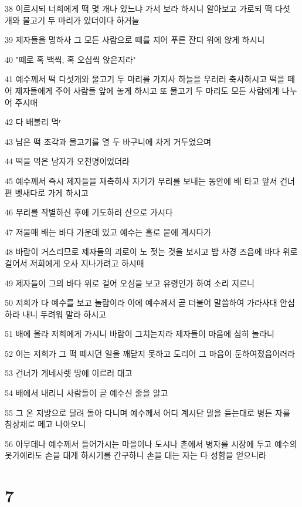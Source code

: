 \par 38 이르시되 너희에게 떡 몇 개나 있느냐 가서 보라 하시니 알아보고 가로되 떡 다섯 개와 물고기 두 마리가 있더이다 하거늘
\par 39 제자들을 명하사 그 모든 사람으로 떼를 지어 푸른 잔디 위에 앉게 하시니
\par 40 "떼로 혹 백씩, 혹 오십씩 앉은지라"
\par 41 예수께서 떡 다섯개와 물고기 두 마리를 가지사 하늘을 우러러 축사하시고 떡을 떼어 제자들에게 주어 사람들 앞에 놓게 하시고 또 물고기 두 마리도 모든 사람에게 나누어 주시매
\par 42 다 배불리 먹ʳ
\par 43 남은 떡 조각과 물고기를 열 두 바구니에 차게 거두었으며
\par 44 떡을 먹은 남자가 오천명이었더라
\par 45 예수께서 즉시 제자들을 재촉하사 자기가 무리를 보내는 동안에 배 타고 앞서 건너편 벳새다로 가게 하시고
\par 46 무리를 작별하신 후에 기도하러 산으로 가시다
\par 47 저물매 배는 바다 가운데 있고 예수는 홀로 뭍에 계시다가
\par 48 바람이 거스리므로 제자들의 괴로이 노 젓는 것을 보시고 밤 사경 즈음에 바다 위로 걸어서 저희에게 오사 지나가려고 하시매
\par 49 제자들이 그의 바다 위로 걸어 오심을 보고 유령인가 하여 소리 지르니
\par 50 저희가 다 예수를 보고 놀람이라 이에 예수께서 곧 더불어 말씀하여 가라사대 안심하라 내니 두려워 말라 하시고
\par 51 배에 올라 저희에게 가시니 바람이 그치는지라 제자들이 마음에 심히 놀라니
\par 52 이는 저희가 그 떡 떼시던 일을 깨닫지 못하고 도리어 그 마음이 둔하여졌음이러라
\par 53 건너가 게네사렛 땅에 이르러 대고
\par 54 배에서 내리니 사람들이 곧 예수신 줄을 알고
\par 55 그 온 지방으로 달려 돌아 다니며 예수께서 어디 계시단 말을 듣는대로 병든 자를 침상채로 메고 나아오니
\par 56 아무데나 예수께서 들어가시는 마을이나 도시나 촌에서 병자를 시장에 두고 예수의 옷가에라도 손을 대게 하시기를 간구하니 손을 대는 자는 다 성함을 얻으니라

\chapter{7}

